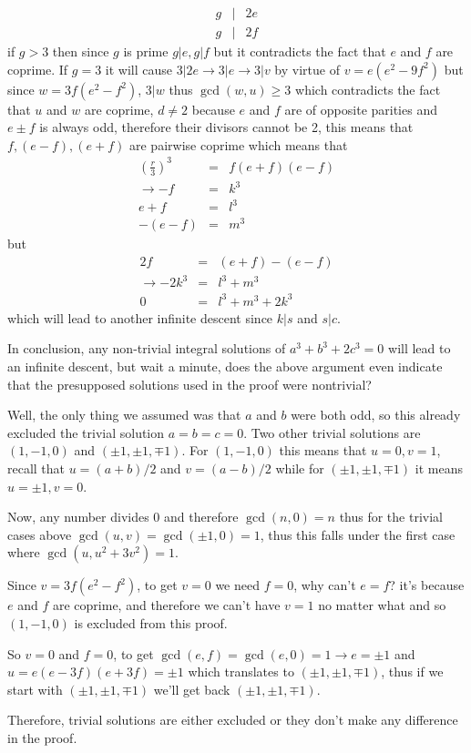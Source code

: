 \documentclass[aps,preprint,preprintnumbers,nofootinbib,showpacs,prd]{revtex4-1}
\newcommand{\nbea}{\begin{eqnarray*}}
\newcommand{\neea}{\end{eqnarray*}}
\begin{document}
%
\nbea
g &|& 2e \\
g &|& 2f
\neea
%
if $g > 3$ then since $g$ is prime $g|e, g|f$ but it contradicts the fact that $e$ and $f$ are coprime. If $g=3$ it will cause $3 |2e \to 3|e \to 3|v$ by virtue of $v = e (e^2 - 9f^2)$ but since $w = 3f (e^2 - f^2)$, $3|w$ thus $\gcd(w,u) \ge 3$ which contradicts the fact that $u$ and $w$ are coprime, $d \neq 2$ because $e$ and $f$ are of opposite parities and $e \pm f$ is always odd, therefore their divisors cannot be 2, this means that $f, (e-f), (e+f)$ are pairwise coprime which means that
%
\nbea
\left (\frac{r}{3}\right)^3 & = & f (e+f)(e-f) \\
\to -f & = & k^3 \\
e + f & = & l^3 \\
-(e - f) & = & m^3
\neea
%
but
%
\nbea
2f & = & (e + f) - (e - f) \\
\to -2k^3 & = & l^3 + m^3 \\
0 & = & l^3 + m^3 + 2k^3
\neea
%
which will lead to another infinite descent since $k|s$ and $s|c$.

In conclusion, any non-trivial integral solutions of $a^3 + b^3 + 2c^3 = 0$ will lead to an infinite descent, but wait a minute, does the above argument even indicate that the presupposed solutions used in the proof were nontrivial?

Well, the only thing we assumed was that $a$ and $b$ were both odd, so this already excluded the trivial solution $a = b = c = 0$. Two other trivial solutions are $(1,-1,0)$ and $(\pm1,\pm1,\mp1)$. For $(1,-1,0)$ this means that $u = 0, v = 1$, recall that $u = (a + b)/2$ and $v = (a - b)/2$ while for $(\pm1,\pm1,\mp1)$ it means $u = \pm1, v = 0$.

Now, any number divides 0 and therefore $\gcd(n,0) = n$ thus for the trivial cases above $\gcd(u,v) = \gcd(\pm1, 0) = 1$, thus this falls under the first case where $\gcd(u, u^2 + 3v^2) = 1$. 

Since $v = 3f(e^2 - f^2)$, to get $v = 0$ we need $f = 0$, why can't $e = f$? it's because $e$ and $f$ are coprime, and therefore we can't have $v=1$ no matter what and so $(1,-1,0)$ is excluded from this proof.

So $v=0$ and $f=0$, to get $\gcd(e,f) = \gcd(e,0) = 1 \to e=\pm1$ and $u = e(e-3f)(e+3f) = \pm1$ which translates to $(\pm1, \pm1, \mp1)$, thus if we start with $(\pm1,\pm1,\mp1)$ we'll get back $(\pm1,\pm1,\mp1)$.

Therefore, trivial solutions are either excluded or they don't make any difference in the proof.
\end{document}
